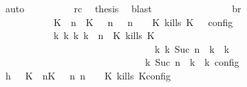 \begin{isabellebody}
\ auto\isanewline
\ \ \ \ \ \ \ \ \isamarkupfalse%
\ rc\ \isamarkupfalse%
\ {\isacharquery}thesis\ \isamarkupfalse%
\ blast\isanewline
\ \ \ \ \ \ \isamarkupfalse%
\isanewline
\ \ \ \ \ \ \isamarkupfalse%
\ \isamarkupfalse%
\ br{}{\isacharcolon}\isanewline
\ \ \ \ \ \ \ \ {\isacartoucheopen}{\isasymrho}\ {\isasymin}\ {\isasymlbrakk}\ {\isacharparenleft}{\isacharparenleft}K\ {\isasymUp}\ n{\isacharparenright}\ {\isacharhash}\ {\isacharparenleft}K\ {\isasymnot}{\isasymUp}\ {\isasymge}\ n{\isacharparenright}\ {\isacharhash}\ {\isasymGamma}{\isacharparenright}{\isacharcomma}\ n\ {\isasymturnstile}\ {\isasymPsi}\ {\isasymtriangleright}\ {\isacharparenleft}{\isacharparenleft}K\ kills\ K\ {\isacharhash}\ {\isasymPhi}{\isacharparenright}\ {\isasymrbrakk}\isactrlsub c\isactrlsub o\isactrlsub n\isactrlsub f\isactrlsub i\isactrlsub g\isanewline
\ \ \ \ \ \ \ \ \ \ {\isasymLongrightarrow}\ {\isasymexists}{\isasymGamma}\isactrlsub k\ {\isasymPsi}\isactrlsub k\ {\isasymPhi}\isactrlsub k\ k{\isachardot}\ {\isacharparenleft}{\isacharparenleft}{\isasymGamma}{\isacharcomma}\ n\ {\isasymturnstile}\ {\isacharparenleft}{\isacharparenleft}K\ kills\ K\ {\isacharhash}\ {\isasymPsi}{\isacharparenright}\ {\isasymtriangleright}\ {\isasymPhi}{\isacharparenright}\isanewline
\ \ \ \ \ \ \ \ \ \ \ \ \ \ \ \ \ \ \ \ \ \ \ \ \ \ \ \ \ \ \ \ {\isasymhookrightarrow}\isactrlbsup k\isactrlesup \ {\isacharparenleft}{\isasymGamma}\isactrlsub k{\isacharcomma}\ Suc\ n\ {\isasymturnstile}\ {\isasymPsi}\isactrlsub k\ {\isasymtriangleright}\ {\isasymPhi}\isactrlsub k{\isacharparenright}{\isacharparenright}\isanewline
\ \ \ \ \ \ \ \ \ \ \ \ \ \ \ \ \ \ \ \ \ \ \ \ \ \ {\isasymand}\ {\isasymrho}\ {\isasymin}\ {\isasymlbrakk}\ {\isasymGamma}\isactrlsub k{\isacharcomma}\ Suc\ n\ {\isasymturnstile}\ {\isasymPsi}\isactrlsub k\ {\isasymtriangleright}\ {\isasymPhi}\isactrlsub k\ {\isasymrbrakk}\isactrlsub c\isactrlsub o\isactrlsub n\isactrlsub f\isactrlsub i\isactrlsub g{\isacartoucheclose}\isanewline
\ \ \ \ \ \ \isamarkupfalse%
\ {\isacharminus}\isanewline
\ \ \ \ \ \ \ \ \isamarkupfalse%
\ h{}{\isacharcolon}\ {\isacartoucheopen}{\isasymrho}\ {\isasymin}\ {\isasymlbrakk}{\isacharparenleft}{\isacharparenleft}K\ {\isasymUp}\ n{\isacharparenright}{\isacharhash}{\isacharparenleft}K\ {\isasymnot}{\isasymUp}\ {\isasymge}\ n{\isacharparenright}{\isacharhash}{\isasymGamma}{\isacharparenright}{\isacharcomma}\ n\ {\isasymturnstile}\ {\isasymPsi}\ {\isasymtriangleright}\ {\isacharparenleft}{\isacharparenleft}K\ kills\ K\isactrlsub c\isactrlsub o\isactrlsub n\isactrlsub f\isactrlsub i\isactrlsub g{\isacartoucheclose}\isanewline

\end{isabellebody}

